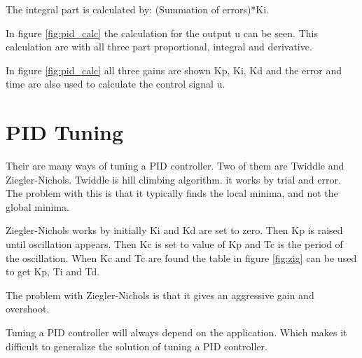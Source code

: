 
The integral part is calculated by: (Summation of errors)*Ki. 

In figure \ref{fig:pid_calc} the calculation for the output u can be seen. This calculation are with all three part proportional, integral and derivative.


In figure \ref{fig:pid_calc} all three gains are shown {Kp, Ki, Kd} and the error and time are also used to calculate the control signal u.

\section{PID Tuning}

Their are many ways of tuning a PID controller. Two of them are Twiddle and Ziegler-Nichols.
Twiddle is hill climbing algorithm. it works by trial and error. The problem with this is that it typically finds the local minima, and not the global minima. 

Ziegler-Nichols works by initially Ki and Kd are set to zero. Then Kp is raised until oscillation appears. Then Kc is set to value of Kp and Tc is the period of the oscillation. When Kc and Tc are found the table in figure \ref{fig:zig} can be used to get Kp, Ti and Td.


The problem with Ziegler-Nichols is that it gives an aggressive gain and overshoot. 

Tuning a PID controller will always depend on the application. Which makes it difficult to generalize the solution of tuning a PID controller.
